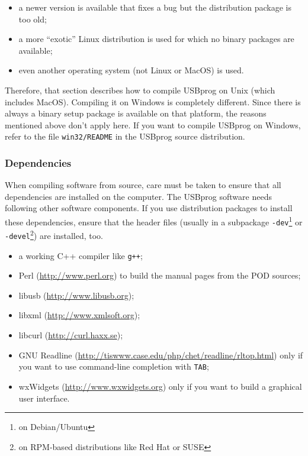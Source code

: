 \documentclass[bibtotoc,UKenglish,halfparskip,oneside,DIV12]{scrreprt}
\begin{document}
\begin{itemize}
  \item a newer version is available that fixes a bug but the distribution package is too old;
  \item a more ``exotic'' Linux distribution is used for which no binary packages are available;
  \item even another operating system (not Linux or MacOS) is used.
\end{itemize}

Therefore, that section describes how to compile USBprog on Unix (which includes MacOS).  Compiling
it on Windows is completely different. Since there is always a binary setup package is available on
that platform, the reasons mentioned above don't apply here. If you want to compile USBprog on
Windows, refer to the file \texttt{win32/README} in the USBprog source distribution.

\subsubsection{Dependencies}

When compiling software from source, care must be taken to ensure that all dependencies are
installed on the computer. The USBprog software needs following other software components. If you
use distribution packages to install these dependencies, ensure that the header files (usually in a
subpackage \texttt{-dev}\footnote{on Debian/Ubuntu} or \texttt{-devel}\footnote{on RPM-based
distributions like Red Hat or SUSE}) are installed, too.

\begin{itemize}
  \item a working C++ compiler like \texttt{g++};
  \item Perl (\url{http://www.perl.org}) to build the manual pages from the POD sources;
  \item libusb (\url{http://www.libusb.org});
  \item libxml (\url{http://www.xmlsoft.org});
  \item libcurl (\url{http://curl.haxx.se});
  \item GNU Readline (\url{http://tiswww.case.edu/php/chet/readline/rltop.html}) only if you want to
    use command-line completion with \texttt{TAB};
  \item wxWidgets (\url{http://www.wxwidgets.org}) only if you want to build a graphical user
    interface.
\end{itemize}
\end{document}
